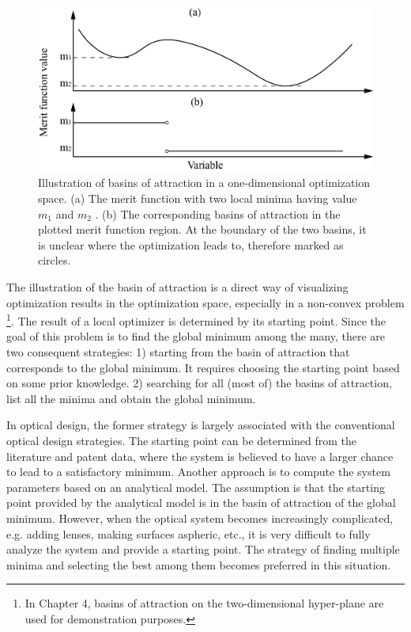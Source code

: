 \begin{figure}
    \centering
    \includegraphics[scale=0.58]{chapter-1/figures/basinOfattraction.png}
    \caption{Illustration of basins of attraction in a one-dimensional optimization space. (a) The merit function with two local minima having value $m_1$ and $m_2$ . (b) The corresponding basins of attraction in the plotted merit function region. At the boundary of the two basins, it is unclear where the optimization leads to, therefore marked as circles.}
    \label{fig: basinOfattraction}
\end{figure} 

The illustration of the basin of attraction is a direct way of visualizing optimization results in the optimization space, especially in a non-convex problem \footnote{In Chapter 4, basins of attraction on the two-dimensional hyper-plane are used for demonstration purposes. }. The result of a local optimizer is determined by its starting point. Since the goal of this problem is to find the global minimum among the many, there are two consequent strategies: 
1) starting from the basin of attraction that corresponds to the global minimum. It requires choosing the starting point based on some prior knowledge. 
2) searching for all (most of) the basins of attraction, list all the minima and obtain the global minimum.

In optical design, the former strategy is largely associated with the conventional optical design strategies. The starting point can be determined from the literature and patent data, where the system is believed to have a larger chance to lead to a satisfactory minimum. Another approach is to compute the system parameters based on an analytical model. The assumption is that the starting point provided by the analytical model is in the basin of attraction of the global minimum. However, when the optical system becomes increasingly complicated, e.g. adding lenses, making surfaces aspheric, etc., it is very difficult to fully analyze the system and provide a starting point. The strategy of finding multiple minima and selecting the best among them becomes preferred in this situation. 


